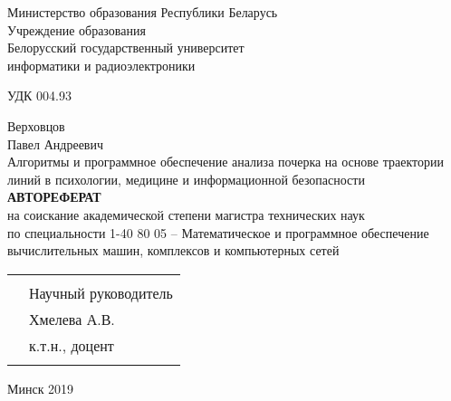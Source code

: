 \begin{titlepage}
  \begin{center}
    Министерство образования Республики Беларусь\\
    Учреждение образования\\
    Белорусский государственный университет \\
    информатики и радиоэлектроники\\[1em]

    \begin{flushleft}
        УДК 004.93
    \end{flushleft}
    Верховцов \\
    Павел Андреевич \\[1em]

    Алгоритмы и программное обеспечение анализа почерка на основе траектории линий в психологии, медицине и информационной безопасности\\[2em]

    \textbf{АВТОРЕФЕРАТ}\\
    {на соискание академической степени магистра технических наук}\\[2em]
    
    {по специальности 1-40 80 05 – Математическое и программное обеспечение вычислительных  машин, комплексов и компьютерных сетей}\\[3em]

    \begin{tabular}{ p{}p{} }
      & \\[1em]
      & Научный руководитель \\
      & Хмелева А.В.\\
      & к.т.н., доцент \\[3em]
      &
    \end{tabular}

    \vfill
    {\normalsize Минск 2019}
  \end{center}
\end{titlepage}
